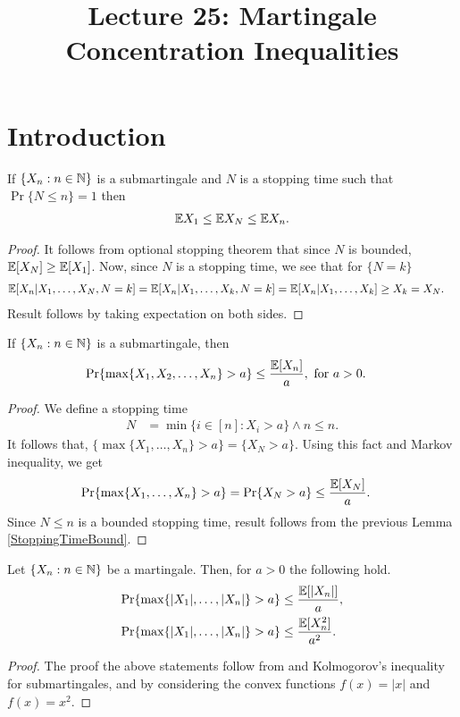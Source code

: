 \documentclass[a4paper,10pt,english]{article}
\title{Lecture 25: Martingale Concentration Inequalities}
\author{}
\begin{document}
\maketitle
\section{Introduction}

\begin{lem}
\label{StoppingTimeBound}
If $\{X_n: n \in \mathbb{N} \}$ is  a submartingale and $N$ is a stopping time such that $\Pr\{N \leq n\}=1$ then
\begin{align*}
 \mathbb{E} X_1 \leq \mathbb{E} X_N \leq \mathbb{E} X_n.
\end{align*}
\end{lem}
\begin{proof}
It follows from optional stopping theorem that since $N$ is bounded, $\mathbb{E}[X_N] \geq \mathbb{E}[X_1]$. 
Now, since $N$ is a stopping time, we see that for $\{N = k\}$
\begin{align*}
\mathbb{E}[X_n|X_1, \ldots, X_N, N = k ]&= \mathbb{E}[X_n|X_1, \ldots, X_k, N=k] = \mathbb{E}[X_n|X_1, \ldots, X_k] \geq X_k = X_N.
\end{align*}
Result follows by taking expectation on both sides.
\end{proof}

\begin{thm} If $\{X_n: n \in \mathbb{N} \}$ is a submartingale, then
\begin{align*}
\Pr\{\max\{X_1,X_2, \ldots, X_n\}>a\} &\leq \frac{\mathbb{E}[X_n]}{a},\text{ for } a>0.
\end{align*}
\end{thm}
\begin{proof}
We define a stopping time 
\begin{align*}
N &= \min\{i \in [n]: X_i >a\} \wedge n \leq n.
\end{align*} %
It follows that, $\{\max\{X_1, \ldots, X_n\}>a\} = \{X_N > a\}$. 
Using this fact and Markov inequality, we get
\begin{align*}
\Pr\{\max\{X_1, \ldots, X_n\}>a\} &=\Pr\{X_N>a\} \leq \frac{\mathbb{E}[X_N]}{a}.
\end{align*}
Since $N \leq n$ is a bounded stopping time, result follows from the previous Lemma \ref{StoppingTimeBound}.
\end{proof}
\begin{cor}
\label{MartingaleBoundCor}
Let $\{X_n : n \in \mathbb{N} \}$ be a martingale. Then, for $a>0$ the following hold.
\begin{align*}
\Pr\{\max\{|X_1|, \ldots, |X_n|\}>a\} &\leq \frac{\mathbb{E}[|X_n|]}{a},\\
\Pr\{\max\{|X_1|, \ldots, |X_n|\}>a\} &\leq \frac{\mathbb{E}[X_n^2]}{a^2}.
\end{align*}
\end{cor}
\begin{proof}
The proof the above statements follow from and Kolmogorov's inequality for submartingales, and by considering the convex functions $f(x)=|x|$ and $f(x)=x^2$. 
\end{proof}
\end{document}
